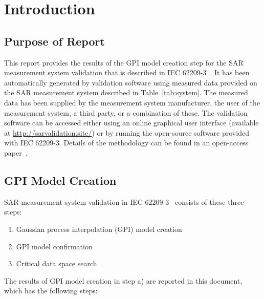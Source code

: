 \documentclass{article}
\begin{document}
\section{Introduction}\label{sec:start}

\subsection{Purpose of Report}\label{sec:intro}
This report provides the results of the GPI model creation step for the SAR measurement system validation that is described in IEC 62209-3~\cite{standard}. It has been automatically generated by validation software using measured data provided on the SAR measurement system described in Table~\ref{tab:system}. The measured data has been supplied by the measurement system manufacturer, the user of the measurement system, a third party, or a combination of these. The validation software can be accessed either using an online graphical user interface (available at \url{http://sarvalidation.site/}) or by running the open-source software provided with IEC 62209-3. Details of the methodology can be found in an open-access paper~\cite{gpi-paper}.


\subsection{GPI Model Creation}\label{sec:procedure}
SAR measurement system validation in IEC 62209-3~\cite{standard} consists of these three steps:

\begin{enumerate}[label=\alph*)]
\item Gaussian process interpolation (GPI) model creation
\item GPI model confirmation
\item Critical data space search
\end{enumerate}

The results of GPI model creation in step a) are reported in this document, which has the following steps:
\end{document}
